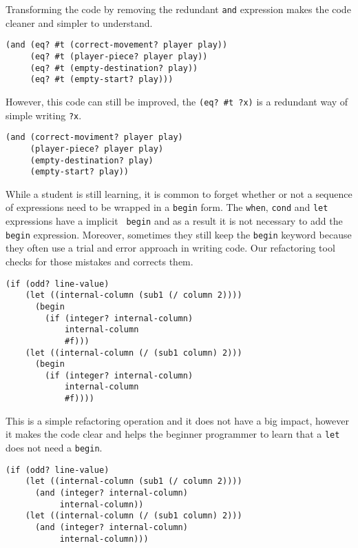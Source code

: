 Transforming the code by removing the redundant {\tt and} expression makes the code
cleaner and simpler to understand.
\begin{lstlisting}
(and (eq? #t (correct-movement? player play))
     (eq? #t (player-piece? player play))
     (eq? #t (empty-destination? play))
     (eq? #t (empty-start? play)))
\end{lstlisting}

However, this code can still be improved, the {\tt (eq? \#t ?x)} is a redundant way
of simple writing {\tt ?x}.
\begin{lstlisting}
(and (correct-moviment? player play)
     (player-piece? player play)
     (empty-destination? play)
     (empty-start? play))
\end{lstlisting}

While a student is still learning, it is common to forget whether or not a
sequence of expressions need to be wrapped in a {\tt begin} form.  The
{\tt when}, {\tt cond} and {\tt let} expressions have a implicit {\tt
  begin} and as a result it is not necessary to add the {\tt begin}
expression.  Moreover, sometimes they still keep the {\tt begin}
keyword because they often use a trial and error approach in writing
code.  Our refactoring tool checks for those mistakes and corrects
them. \\

\begin{lstlisting}
(if (odd? line-value)
    (let ((internal-column (sub1 (/ column 2))))
      (begin
        (if (integer? internal-column)
            internal-column
            #f)))
    (let ((internal-column (/ (sub1 column) 2)))
      (begin
        (if (integer? internal-column)
            internal-column
            #f))))
\end{lstlisting}


This is a simple refactoring operation and it does not have a big
impact, however it makes the code clear and helps the beginner
programmer to learn that a {\tt let} does not need a {\tt begin}.
\begin{lstlisting}
(if (odd? line-value)
    (let ((internal-column (sub1 (/ column 2))))
      (and (integer? internal-column)
           internal-column))
    (let ((internal-column (/ (sub1 column) 2)))
      (and (integer? internal-column)
           internal-column)))
\end{lstlisting}



